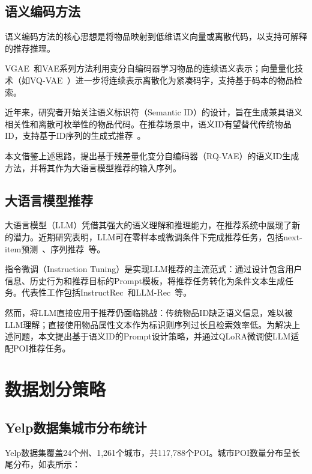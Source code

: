 \subsection{语义编码方法}
\label{sec:semantic_encoding}

语义编码方法的核心思想是将物品映射到低维语义向量或离散代码，以支持可解释的推荐推理。

VGAE~\cite{kipf2016variational}和VAE系列方法利用变分自编码器学习物品的连续语义表示；向量量化技术（如VQ-VAE~\cite{van2017neural}）进一步将连续表示离散化为紧凑码字，支持基于码本的物品检索。

近年来，研究者开始关注语义标识符（Semantic ID）的设计，旨在生成兼具语义相关性和离散可枚举性的物品代码。在推荐场景中，语义ID有望替代传统物品ID，支持基于ID序列的生成式推荐~\cite{zhou2024sid}。

本文借鉴上述思路，提出基于残差量化变分自编码器（RQ-VAE）的语义ID生成方法，并将其作为大语言模型推荐的输入序列。

\subsection{大语言模型推荐}
\label{sec:llm_rec}

大语言模型（LLM）凭借其强大的语义理解和推理能力，在推荐系统中展现了新的潜力。近期研究表明，LLM可在零样本或微调条件下完成推荐任务，包括next-item预测~\cite{heidari2024llm4rec}、序列推荐~\cite{liu2024llmseq}等。

指令微调（Instruction Tuning）是实现LLM推荐的主流范式：通过设计包含用户信息、历史行为和推荐目标的Prompt模板，将推荐任务转化为条件文本生成任务。代表性工作包括InstructRec~\cite{zhange2023instructrec}和LLM-Rec~\cite{liu2024llm4rec}等。

然而，将LLM直接应用于推荐仍面临挑战：传统物品ID缺乏语义信息，难以被LLM理解；直接使用物品属性文本作为标识则序列过长且检索效率低。为解决上述问题，本文提出基于语义ID的Prompt设计策略，并通过QLoRA微调使LLM适配POI推荐任务。

\section{数据划分策略}
\label{sec:data_split}

\subsection{Yelp数据集城市分布统计}
\label{sec:city_distribution}

Yelp数据集覆盖24个州、1,261个城市，共117,788个POI。城市POI数量分布呈长尾分布，如表所示：

